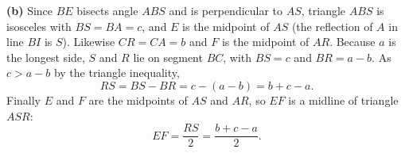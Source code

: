 \textbf{(b)} Since $BE$ bisects angle $ABS$ and is perpendicular to $AS$, triangle $ABS$ is isosceles with $BS=BA=c$, and $E$ is the midpoint of $AS$ (the reflection of $A$ in line $BI$ is $S$). Likewise $CR=CA=b$ and $F$ is the midpoint of $AR$. Because $a$ is the longest side, $S$ and $R$ lie on segment $BC$, with $BS=c$ and $BR=a-b$. As $c>a-b$ by the triangle inequality,
\[
RS=BS-BR=c-(a-b)=\boxed{b+c-a}.
\]
Finally $E$ and $F$ are the midpoints of $AS$ and $AR$, so $EF$ is a midline of triangle $ASR$:
\[
EF=\dfrac{RS}{2}=\boxed{\dfrac{b+c-a}{2}}.
\]
